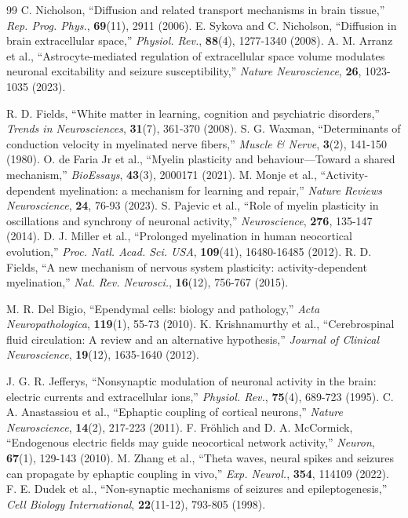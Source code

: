\documentclass[12pt,a4paper]{article}
\begin{document}
\begin{thebibliography}{99}
		 C. Nicholson, ``Diffusion and related transport mechanisms in brain tissue,'' \emph{Rep. Prog. Phys.}, \textbf{69}(11), 2911 (2006).
		 E. Sykova and C. Nicholson, ``Diffusion in brain extracellular space,'' \emph{Physiol. Rev.}, \textbf{88}(4), 1277-1340 (2008).
		 A. M. Arranz et al., ``Astrocyte-mediated regulation of extracellular space volume modulates neuronal excitability and seizure susceptibility,'' \emph{Nature Neuroscience}, \textbf{26}, 1023-1035 (2023).
		
		 R. D. Fields, ``White matter in learning, cognition and psychiatric disorders,'' \emph{Trends in Neurosciences}, \textbf{31}(7), 361-370 (2008).
		 S. G. Waxman, ``Determinants of conduction velocity in myelinated nerve fibers,'' \emph{Muscle \& Nerve}, \textbf{3}(2), 141-150 (1980).
		 O. de Faria Jr et al., ``Myelin plasticity and behaviour—Toward a shared mechanism,'' \emph{BioEssays}, \textbf{43}(3), 2000171 (2021).
		 M. Monje et al., ``Activity-dependent myelination: a mechanism for learning and repair,'' \emph{Nature Reviews Neuroscience}, \textbf{24}, 76-93 (2023).
		 S. Pajevic et al., ``Role of myelin plasticity in oscillations and synchrony of neuronal activity,'' \emph{Neuroscience}, \textbf{276}, 135-147 (2014).
		 D. J. Miller et al., ``Prolonged myelination in human neocortical evolution,'' \emph{Proc. Natl. Acad. Sci. USA}, \textbf{109}(41), 16480-16485 (2012).
		 R. D. Fields, ``A new mechanism of nervous system plasticity: activity-dependent myelination,'' \emph{Nat. Rev. Neurosci.}, \textbf{16}(12), 756-767 (2015).
		
		 M. R. Del Bigio, ``Ependymal cells: biology and pathology,'' \emph{Acta Neuropathologica}, \textbf{119}(1), 55-73 (2010).
		 K. Krishnamurthy et al., ``Cerebrospinal fluid circulation: A review and an alternative hypothesis,'' \emph{Journal of Clinical Neuroscience}, \textbf{19}(12), 1635-1640 (2012).
		
		 J. G. R. Jefferys, ``Nonsynaptic modulation of neuronal activity in the brain: electric currents and extracellular ions,'' \emph{Physiol. Rev.}, \textbf{75}(4), 689-723 (1995).
		 C. A. Anastassiou et al., ``Ephaptic coupling of cortical neurons,'' \emph{Nature Neuroscience}, \textbf{14}(2), 217-223 (2011).
		 F. Fröhlich and D. A. McCormick, ``Endogenous electric fields may guide neocortical network activity,'' \emph{Neuron}, \textbf{67}(1), 129-143 (2010).
		 M. Zhang et al., ``Theta waves, neural spikes and seizures can propagate by ephaptic coupling in vivo,'' \emph{Exp. Neurol.}, \textbf{354}, 114109 (2022).
		 F. E. Dudek et al., ``Non-synaptic mechanisms of seizures and epileptogenesis,'' \emph{Cell Biology International}, \textbf{22}(11-12), 793-805 (1998).
		

\end{thebibliography}
\end{document}
